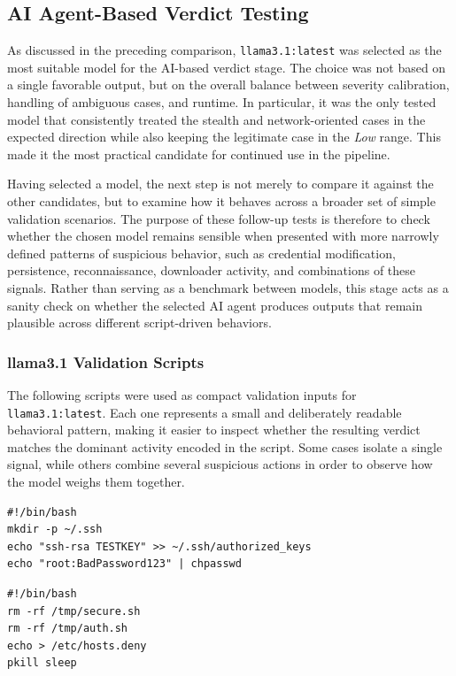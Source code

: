 \newpage

\subsection{AI Agent-Based Verdict Testing}
\noindent
As discussed in the preceding comparison, \texttt{llama3.1:latest} was selected as
the most suitable model for the AI-based verdict stage. The choice was not based
on a single favorable output, but on the overall balance between severity
calibration, handling of ambiguous cases, and runtime. In particular, it was the
only tested model that consistently treated the stealth and network-oriented
cases in the expected direction while also keeping the legitimate case in the
\textit{Low} range. This made it the most practical candidate for continued use
in the pipeline.

\noindent
Having selected a model, the next step is not merely to compare it against the
other candidates, but to examine how it behaves across a broader set of simple
validation scenarios. The purpose of these follow-up tests is therefore to check
whether the chosen model remains sensible when presented with more narrowly
defined patterns of suspicious behavior, such as credential modification,
persistence, reconnaissance, downloader activity, and combinations of these
signals. Rather than serving as a benchmark between models, this stage acts as a
sanity check on whether the selected AI agent produces outputs that remain
plausible across different script-driven behaviors.


\subsubsection{llama3.1 Validation Scripts}
\noindent
The following scripts were used as compact validation inputs for
\texttt{llama3.1:latest}. Each one represents a small and deliberately readable
behavioral pattern, making it easier to inspect whether the resulting verdict
matches the dominant activity encoded in the script. Some cases isolate a single
signal, while others combine several suspicious actions in order to observe how
the model weighs them together.


\begin{minipage}[t][3.0cm][t]{0.45\textwidth}
\vspace{-6mm}
\begin{verbatim}
#!/bin/bash
mkdir -p ~/.ssh
echo "ssh-rsa TESTKEY" >> ~/.ssh/authorized_keys
echo "root:BadPassword123" | chpasswd

\end{verbatim}
\end{minipage}
\hfill
\begin{minipage}[t][3.0cm][t]{0.45\textwidth}
\vspace{-6mm}
\begin{verbatim}
#!/bin/bash
rm -rf /tmp/secure.sh
rm -rf /tmp/auth.sh
echo > /etc/hosts.deny
pkill sleep
\end{verbatim}
\end{minipage}

